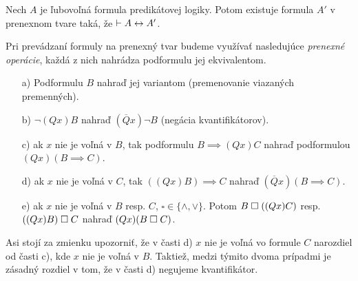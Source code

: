 \begin{veta}
 Nech $A$ je ľubovoľná formula predikátovej logiky. Potom existuje
 formula $A'$ v prenexnom tvare taká, že
 $\vdash A \leftrightarrow A'$.
 \label{veta:prenex}
\end{veta}

Pri prevádzaní formuly na prenexný tvar budeme využívať nasledujúce
{\it prenexné operácie}, každá z nich nahrádza podformulu
jej ekvivalentom.
\begin{itemize}
    \item[a)] Podformulu $B$ nahraď jej variantom (premenovanie viazaných
        premenných).

    \item[b)] $\neg(Q x) B$ nahraď $(\overline{Q} x) \neg B$
        (negácia kvantifikátorov).

    \item[c)] ak $x$ nie je voľná v $B$, tak podformulu $B\implies (Qx)C$
            nahraď podformulou $(Qx) (B\implies C)$.

    \item[d)] ak $x$ nie je voľná v $C$, tak $((Qx) B) \implies C$
        nahraď $(\overline{Q} x) (B \implies C)$.

    \item[e)] ak $x$ nie je voľná v $B$ resp. $C$, $\square \in \{\land,\lor\}$.
     Potom $B \;\square\; ((Qx)C)$ resp. $((Qx)B)\;\square\; C$ nahraď
     $(Qx)(B \;\square\; C)$.
\end{itemize}
\begin{poznamka}
    Asi stojí za zmienku upozorniť, že v časti d) $x$ nie je voľná vo
    formule $C$ narozdiel od časti c), kde $x$ nie je voľná v $B$.
    Taktiež, medzi týmito dvoma prípadmi je zásadný rozdiel v
    tom, že v časti d) negujeme kvantifikátor.
\end{poznamka}

